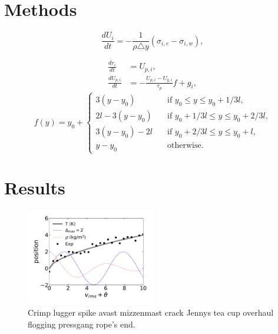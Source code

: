 \documentclass[review,3p]{elsarticle}
\begin{document}
\section{Methods} \label{s:methods}

\lipsum[1]
%
\begin{equation}
    \frac{dU_i}{dt} =-\frac{1}{\rho\triangle
    y}\left(\sigma_{i,e}-\sigma_{i,w}\right),
    \label{e:viscousEvol}
\end{equation}
%

\lipsum[1]
%
\begin{align}
    \frac{dr_{i}}{dt} & =U_{p,i}, \label{e:ppos}\\
    \frac{dU_{p,i}}{dt} & =-\frac{U_{p,i}-U_{g,i}}{\tau_{p}}f+g_{i}, \label{e:pmom}
\end{align}
%
\lipsum[1]
%
\begin{equation}
    f\left(y\right) = y_0 + 
    \begin{cases} 
        3\left(y-y_0\right) & \quad \text{if $y_0\leq y \leq y_0+1/3l$,}\\
        2l-3\left(y-y_0\right) & \quad \text{if $y_0+1/3l\leq y \leq y_0+2/3l$,}\\
        3\left(y-y_0\right)-2l & \quad \text{if $y_0+2/3l\leq y \leq y_0+l$,}\\
        y-y_0 & \quad \text{otherwise.}
    \end{cases}
\end{equation}
%


\section{Results} \label{s:results}

\lipsum[1]

\begin{figure}
    \centering
    \includegraphics[width=0.5\textwidth]{../figures/fig_sample/fig_sample.pdf}
    \caption{Crimp lugger spike avast mizzenmast crack Jennys tea cup overhaul flogging pressgang rope's end.}
    \label{f:sample_1}
\end{figure}
\end{document}
